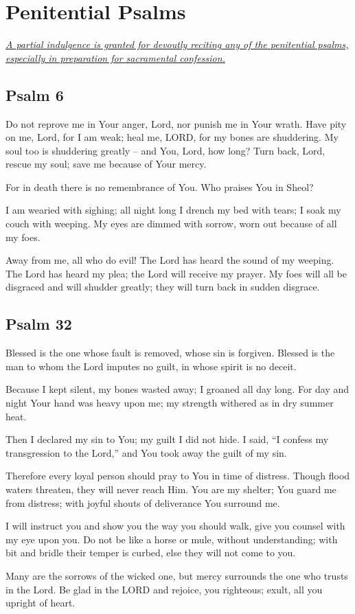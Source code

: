 \documentclass[12pt]{article}
\newcommand{\prayersection}[1]{\section{#1}}
\newcommand{\prayertitle}[1]{\subsection{#1}}
\newcommand{\indulgencedprayertitle}[1]{\prayertitle{#1 \protect\kreuz}}
\newcommand{\note}[1]{{\small{\textsl{#1}}}\newline}
\newcommand{\linkednote}[2]{\hyperlink{#1}{\note{#2}}}
\begin{document}
\newpage

\prayersection{Penitential Psalms}
\linkednote{grant9}{A partial indulgence is granted for devoutly reciting any of the penitential psalms, especially in preparation for sacramental confession.}
\indulgencedprayertitle{Psalm 6}
Do not reprove me in Your anger, Lord,
nor punish me in Your wrath.
Have pity on me, Lord, for I am weak;
heal me, LORD, for my bones are shuddering.
My soul too is shuddering greatly -- and You, Lord, how long?
Turn back, Lord, rescue my soul;
save me because of Your mercy.

For in death there is no remembrance of You.
Who praises You in Sheol?

I am wearied with sighing;
all night long I drench my bed with tears;
I soak my couch with weeping.
My eyes are dimmed with sorrow, worn out because of all my foes.

Away from me, all who do evil!
The Lord has heard the sound of my weeping.
The Lord has heard my plea;
the Lord will receive my prayer.
My foes will all be disgraced and will shudder greatly;
they will turn back in sudden disgrace.

\indulgencedprayertitle{Psalm 32}
Blessed is the one whose fault is removed, whose sin is forgiven.
Blessed is the man to whom the Lord imputes no guilt, in whose spirit is no deceit.

Because I kept silent, my bones wasted away;
I groaned all day long.
For day and night Your hand was heavy upon me;
my strength withered as in dry summer heat.

Then I declared my sin to You;
my guilt I did not hide.
I said, ``I confess my transgression to the Lord,'' and You took away the guilt of my sin.

Therefore every loyal person should pray to You in time of distress.
Though flood waters threaten, they will never reach Him.
You are my shelter; You guard me from distress;
with joyful shouts of deliverance You surround me.

I will instruct you and show you the way you should walk, give you counsel with my eye upon you.
Do not be like a horse or mule, without understanding;
with bit and bridle their temper is curbed, else they will not come to you.

Many are the sorrows of the wicked one, but mercy surrounds the one who trusts in the Lord.
Be glad in the LORD and rejoice, you righteous;
exult, all you upright of heart.
\end{document}
